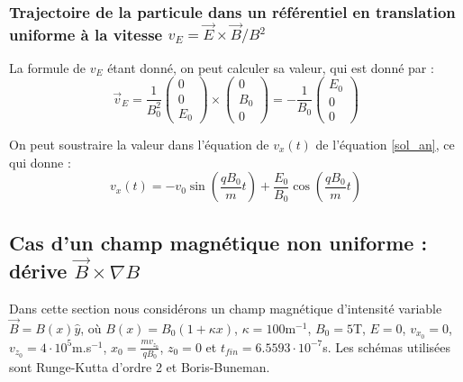 \documentclass[a4paper,12pt,twoside]{article}
\begin{document}
\subsubsection{Trajectoire de la particule dans un r\'ef\'erentiel en translation uniforme \`a la vitesse $v_E = \Vec{E}\times\Vec{B}/B^2$}

La formule de $v_E$ \'etant donn\'e, on peut calculer sa valeur, qui est donn\'e par : 
\begin{equation}\label{v_e}
\Vec{v}_E = \frac{1}{B_0^2}\begin{pmatrix}0 \\ 0 \\ E_0 \end{pmatrix}\times\begin{pmatrix}0 \\ B_0 \\ 0 \end{pmatrix} = -\frac{1}{B_0}\begin{pmatrix}E_0 \\ 0 \\ 0 \end{pmatrix}
\end{equation}

On peut soustraire la valeur dans l'\'equation de $v_x(t)$ de l'\'equation \ref{sol_an}, ce qui donne :
\begin{equation}\label{sol v_e}
v_x(t) = - v_0\sin(\frac{qB_0}{m}t) + \frac{E_0}{B_0}\cos(\frac{qB_0}{m}t)
\end{equation}



\subsection{Cas d'un champ magn\'etique non uniforme : d\'erive $\Vec{B}\times\nabla B$}
Dans cette section nous consid\'erons un champ magn\'etique d'intensit\'e variable $\Vec{B} = B(x)\hat{y}$, o\`u $B(x) = B_0(1 + \kappa x)$, $\kappa = 100$m$^{-1}$, $B_0 = 5$T, $E = 0$, $v_{x_0} = 0$, $v_{z_0} = 4\cdot10^5$m.s$^{-1}$, $x_0 = \frac{mv_{z_0}}{qB_0}$, $z_0 = 0$ et $t_{fin} = 6.5593\cdot10^{-7}$s. Les sch\'emas utilis\'ees sont Runge-Kutta d'ordre 2 et Boris-Buneman.
\end{document}
